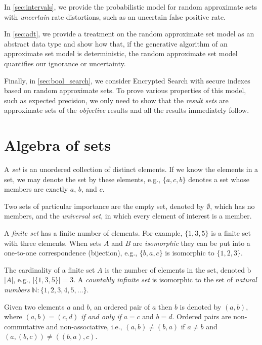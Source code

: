 \documentclass[
]{article}
\begin{document}
In \ref{sec:intervals}, we provide the probabilistic model for random
approximate sets with \emph{uncertain} rate distortions, such as an
uncertain false positive rate.

In \ref{sec:adt}, we provide a treatment on the random approximate set
model as an abstract data type and show how that, if the generative
algorithm of an approximate set model is deterministic, the random
approximate set model quantifies our ignorance or uncertainty.

Finally, in \ref{sec:bool_search}, we consider Encrypted Search with
secure indexes based on random approximate sets. To prove various
properties of this model, such as expected precision, we only need to
show that the \emph{result sets} are approximate sets of the
\emph{objective} results and all the results immediately follow.

\hypertarget{sec:setalgebra}{%
\section{Algebra of sets}\label{sec:setalgebra}}

A \emph{set} is an unordered collection of distinct elements. If we know
the elements in a set, we may denote the set by these elements, e.g.,
\(\{a,c,b\}\) denotes a set whose members are exactly \(a\), \(b\), and
\(c\).

Two sets of particular importance are the empty set, denoted by
\(\emptyset\), which has no members, and the \emph{universal set}, in
which every element of interest is a member.

A \emph{finite set} has a finite number of elements. For example,
\(\{ 1, 3, 5 \}\) is a finite set with three elements. When sets \(A\)
and \(B\) are \emph{isomorphic} they can be put into a one-to-one
correspondence (bijection), e.g., \(\{b,a,c\}\) is isomorphic to
\(\{1,2,3\}\).

The cardinality of a finite set \(A\) is the number of elements in the
set, denoted b \(|A|\), e.g., \(|\{ 1, 3, 5\}| = 3\). A \emph{countably
infinite set} is isomorphic to the set of \emph{natural numbers}
\(\mathbb{N} : \{1,2,3,4,5,\ldots\}\).

Given two elements \(a\) and \(b\), an ordered pair of \(a\) then \(b\)
is denoted by \((a,b)\), where \((a,b) = (c,d)\) \emph{if and only if}
\(a = c\) and \(b = d\). Ordered pairs are non-commutative and
non-associative, i.e., \((a,b) \neq (b,a)\) if \(a \neq b\) and
\((a,(b,c)) \neq ((b,a),c)\).
\end{document}

